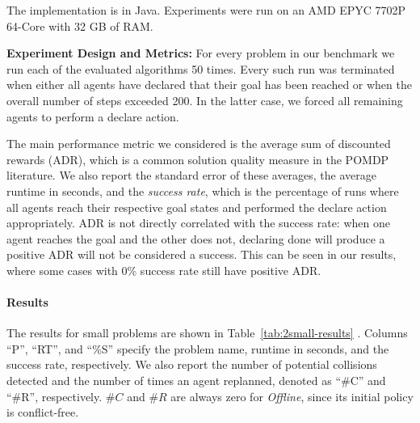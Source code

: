 \documentclass[letterpaper]{article} %
\begin{document}
The implementation is in Java. Experiments were run on an AMD\textsc{\textregistered} EPYC 7702P 64-Core with 32 GB of RAM.



\noindent\textbf{Experiment Design and Metrics:}
For every problem in our benchmark we run each of the evaluated algorithms 50 times.
Every such run was terminated when either all agents have declared that their goal has been reached or when the overall number of steps exceeded 200. In the latter case, we forced all remaining agents to perform a declare action.


The main performance metric we considered is the average sum of discounted rewards (ADR), which is a common solution quality measure in the POMDP literature.
We also report the standard error of these averages, the average runtime in seconds,
and the \emph{success rate}, which is the percentage of runs where all agents reach their respective goal states and performed the declare action appropriately.
ADR is not directly correlated with the success rate: when one agent reaches the goal and the other does not, declaring done will produce a positive ADR will not be considered a success. This can be seen in our results, where some cases with 0\% success rate still have positive ADR.







\paragraph{Results}

The results for small problems are shown in Table~\ref{tab:2small-results} .
Columns ``P'', ``RT'', and ``\%S'' specify the problem name, runtime in seconds, and the success rate, respectively.
We also report the number of potential collisions detected and the number of times an agent replanned, denoted as ``\#C'' and ``\#R'', respectively.
$\#C$ and $\#R$ are always zero for \emph{Offline}, since its initial policy is conflict-free. %
\end{document}
